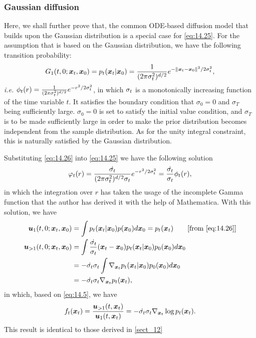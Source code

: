 \subsubsection{Gaussian diffusion}
Here, we shall further prove that, the common ODE-based diffusion model that builds upon the Gaussian distribution is a special case for \cref{eq:14.25}. For the assumption that is based on the Gaussian distribution, we have the following transition probability:
\begin{equation}
    \label{eq:14.26}
    G_{1}(t,0;\bm{x}_{t},\bm{x}_0)=p_t(\bm{x}_{t}|\bm{x}_0)=\frac{1}{(2\pi\sigma_t^2)^{d/2}}e^{-\|\bm{x}_{t}-\bm{x}_0\|^2/2\sigma_t^2},
\end{equation}
\emph{i.e.} $\phi_t(r)=\frac{1}{(2\pi\sigma_t^2)^{d/2}}e^{-r^2/2\sigma_t^2}$, in which $\sigma_t$ is a monotonically increasing function of the time variable $t$. It satisfies the boundary condition that $\sigma_0=0$ and $\sigma_T$ being sufficiently large. $\sigma_0=0$ is set to satisfy the initial value condition, and $\sigma_T$ is to be made sufficiently large in order to make the prior distribution becomes independent from the sample distribution. As for the unity integral constraint, this is naturally satisfied by the Gaussian distribution. 

Substituting \cref{eq:14.26} into \cref{eq:14.25} we have the following solution
\begin{equation}
    \label{eq:14.27}
    \varphi_t(r)=\frac{\dot{\sigma_t}}{(2\pi\sigma_t^2)^{d/2}\sigma_t}e^{-r^2/2\sigma_t^2}=\frac{\dot{\sigma_t}}{\sigma_t}\phi_t(r),
\end{equation}
in which the integration over $r$ has taken the usage of the incomplete Gamma function that the author has derived it with the help of Mathematica. With this solution, we have
\begin{align}
    \bm{u}_1 (t,0;\xt,\x_0)&=\int p_t(\xt|\x_0)p(\x_0)d\x_0=p_t (\xt)\qquad \mbox{[from \cref{eq:14.26}]}\nonumber \\
    \bm{u}_{>1} (t,0;\xt,\x_0)&=\int \frac{\dot{\sigmat}}{\sigmat}(\xt-\x_0)p_t(\xt|\x_0)p_0(\x_0)d\x_0 \nonumber\\
    &=-\dot{\sigmat}\sigmat\int\nabla_{\xt}p_t(\xt|\x_0)p_0(\x_0)d\x_0 \nonumber\\
    &=-\dot{\sigmat}\sigmat\nabla_{\xt}p_t(\xt),\label{eq:14.29}
\end{align}
in which, based on \cref{eq:14.5}, we have 
\begin{equation}
    \label{eq:14.29}
    f_t(\bm{x}_{t})=\frac{\bm{u}_{>1}(t,\bm{x}_{t})}{\bm{u}_{1}(t,\bm{x}_{t})}=-\dot{\sigma_t}\sigma_t\nabla_{\bm{x}_{t}}\log p_t(\bm{x}_{t}).
\end{equation}This result is identical to those derived in \cref{sect_12}

